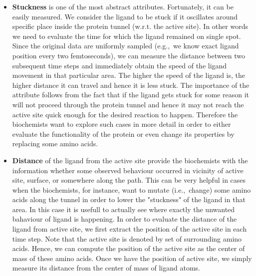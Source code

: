 \documentclass[twocolumn]{bmcart}%
\newcommand{\ie}{i.e.,~}
\newcommand{\eg}{e.g.,~}
\begin{document}
\begin{itemize}

\item \textbf{Stuckness} is one of the most abstract attributes. Fortunately, it can be easily measured. 
We consider the ligand to be stuck if it oscillates around specific place inside the protein tunnel (w.r.t. the active site).  
In other words we need to evaluate the time for which the ligand remained on single spot. 
Since the original data are uniformly sampled (\eg we know exact ligand position every two femtoseconds), we can measure the distance between two subsequent time steps and immediately obtain the speed of the ligand movement in that particular area. 
The higher the speed of the ligand is, the higher distance it can travel and hence it is less stuck. 
The importance of the attribute follows from the fact that if the ligand gets stuck for some reason it will not proceed through the protein tunnel and hence it may not reach the active site quick enough for the desired reaction to happen.
Therefore the biochemists want to explore such cases in more detail in order to either evaluate the functionality of the protein or even change its properties by replacing some amino acids.


\item \textbf{Distance} of the ligand from the active site provide the biochemists with the information whether some observed behaviour occurred in vicinity of active site, surface, or somewhere along the path. 
This can be very helpful in cases when the biochemists, for instance, want to mutate (\ie change) some amino acids along the tunnel in order to lower the "stuckness" of the ligand in that area. 
In this case it is usefull to actually see where exactly the unwanted bahaviour of ligand is happening.
In order to evaluate the distance of the ligand from active site, we first extract the position of the active site in each time step. 
Note that the active site is denoted by set of surrounding amino acids. 
Hence, we can compute the position of the active site as the center of mass of these amino acids. 
Once we have the position of active site, we simply measure its distance from the center of mass of ligand atoms.
      

\end{itemize}
\end{document}
